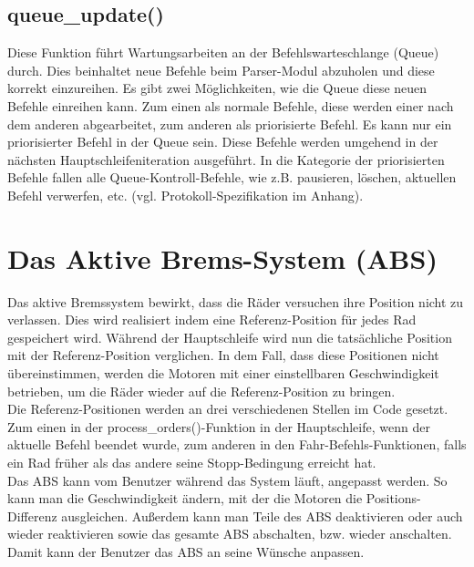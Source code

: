 \subsection{queue\_update()\label{chapter_queue_update}}
Diese Funktion führt Wartungsarbeiten an der Befehlswarteschlange (Queue) durch. Dies beinhaltet neue
Befehle beim Parser-Modul abzuholen und diese korrekt einzureihen. Es gibt zwei Möglichkeiten, wie die Queue
diese neuen Befehle einreihen kann. Zum einen als normale Befehle, diese werden einer nach dem anderen abgearbeitet,
zum anderen als priorisierte Befehl. Es kann nur ein priorisierter Befehl in der Queue sein. Diese Befehle werden
umgehend in der nächsten Haupt\-schleifen\-iteration ausgeführt. In die Kategorie der priorisierten Befehle fallen
alle Queue-Kontroll-Befehle, wie z.B. pausieren, löschen, aktuellen Befehl verwerfen, etc. (vgl. Protokoll-Spezifikation
im Anhang).
\section{Das Aktive Brems-System (ABS)}
Das aktive Bremssystem bewirkt, dass die Räder versuchen ihre Position nicht zu verlassen. Dies wird realisiert indem
eine Referenz-Position für jedes Rad gespeichert wird. Während der Hauptschleife wird nun die tatsächliche Position mit
der Referenz-Position verglichen. In dem Fall, dass diese Positionen nicht übereinstimmen, werden die Motoren mit einer
einstellbaren Geschwindigkeit betrieben, um die Räder wieder auf die Referenz-Position zu bringen.\\
Die Referenz-Positionen werden an drei verschiedenen Stellen im Code gesetzt. Zum einen in der process\_\-orders()-Funktion
in der Hauptschleife, wenn der aktuelle Befehl beendet wurde, zum anderen in den Fahr-Befehls-Funktionen, falls ein Rad
früher als das andere seine Stopp-Bedingung erreicht hat.\\
Das ABS kann vom Benutzer während das System läuft, angepasst werden. So kann man die Geschwindigkeit ändern, mit der
die Motoren die Positions-Differenz ausgleichen. Außerdem kann man Teile des ABS deaktivieren oder auch wieder reaktivieren
sowie das gesamte ABS abschalten, bzw. wieder anschalten. Damit kann der Benutzer das ABS an seine Wünsche anpassen.
